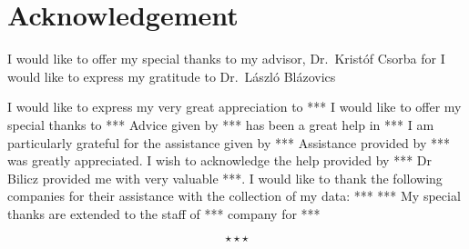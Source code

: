 \chapter*{Acknowledgement}

I would like to offer my special thanks to my advisor, Dr.~Kristóf Csorba for
I would like to express my gratitude to Dr.~László Blázovics

I would like to express my very great appreciation to ***
I would like to offer my special thanks to ***
Advice given by *** has been a great help in ***
I am particularly grateful for the assistance given by ***
Assistance provided by *** was greatly appreciated.
I wish to acknowledge the help provided by ***
Dr Bilicz provided me with very valuable ***.
I would like to thank the following companies for their assistance with the collection of my data:
***
***
My special thanks are extended to the staff of *** company for ***

\begin{displaymath}
	\star \star \star
\end{displaymath}